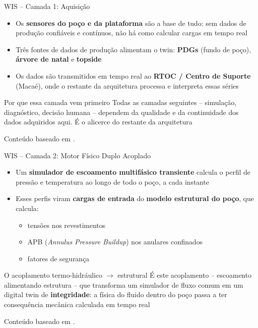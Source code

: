 \documentclass[aspectratio=169,xcolor=dvipsnames]{beamer}
\begin{document}
\begin{frame}{WIS -- Camada 1: Aquisição}
    \begin{itemize}\setlength\itemsep{6pt}
        \item Os \textbf{sensores do poço e da plataforma} são a base de tudo: sem dados de produção confiáveis e contínuos, não há como calcular cargas em tempo real
        \item Três fontes de dados de produção alimentam o twin: \textbf{PDGs} (fundo de poço), \textbf{árvore de natal} e \textbf{topside}
        \item Os dados são transmitidos em tempo real ao \textbf{RTOC / Centro de Suporte} (Macaé), onde o restante da arquitetura processa e interpreta essas séries
    \end{itemize}
    \begin{exampleblock}{Por que essa camada vem primeiro}
        Todas as camadas seguintes -- simulação, diagnóstico, decisão humana -- dependem da qualidade e da continuidade dos dados adquiridos aqui. É o alicerce do restante da arquitetura
    \end{exampleblock}
    \vfill
    \footnotesize Conteúdo baseado em \cite{otc2020}.
\end{frame}

\begin{frame}{WIS -- Camada 2: Motor Físico Duplo Acoplado}
    \begin{itemize}\setlength\itemsep{5pt}
        \item Um \textbf{simulador de escoamento multifásico transiente} calcula o perfil de pressão e temperatura ao longo de todo o poço, a cada instante
        \item Esses perfis viram \textbf{cargas de entrada} do \textbf{modelo estrutural do poço}, que calcula:
        \begin{itemize}
            \item tensões nos revestimentos
            \item APB (\textit{Annulus Pressure Buildup}) nos anulares confinados
            \item fatores de segurança
        \end{itemize}
    \end{itemize}
    \begin{exampleblock}{O acoplamento termo-hidráulico $\rightarrow$ estrutural}
        É este acoplamento -- escoamento alimentando estrutura -- que transforma um simulador de fluxo comum em um digital twin de \textbf{integridade}: a física do fluido dentro do poço passa a ter consequência mecânica calculada em tempo real
    \end{exampleblock}
    \vfill
    \footnotesize Conteúdo baseado em \cite{otc2020}.
\end{frame}
\end{document}
